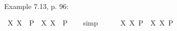\begin{isabellebody}
%
\isadelimproof
\ %
\endisadelimproof
%
\isatagproof
{}\isamarkupfalse%
\ \ \ %
%
\endisatagproof
{\isafoldproof}%
%
\isadelimproof
%
\endisadelimproof
\isanewline
{}\isamarkupfalse%
\ {\isachardoublequoteopen}{\isasymlfloor}{\isacharparenleft}{\isacharparenleft}{\isasymlambda}{\isasymalpha}{\isachardot}\ \isactrlbold {\isasymdiamond}{\isasymphi}\ {\isasymalpha}{\isacharparenright}\ \isactrlbold {\isasymdownharpoonleft}{\isacharparenleft}{\isasymtau}{\isacharcolon}{\isacharcolon}{\isasymup}{\isasymzero}{\isacharparenright}{\isacharparenright}\ \isactrlbold {\isasymleftrightarrow}\ {\isacharparenleft}\isactrlbold {\isasymdiamond}{\isasymphi}\ \isactrlbold {\isasymdownharpoonleft}{\isasymtau}{\isacharparenright}{\isasymrfloor}{\isachardoublequoteclose}\ \isamarkupfalse%
%
\isadelimproof
\ %
\endisadelimproof
%
\isatagproof
{}\isamarkupfalse%
\ \ \ %
%
\endisatagproof
{\isafoldproof}%
%
\isadelimproof
%
\endisadelimproof
%
\begin{isamarkuptext}%
Example 7.13, p. 96:%
\end{isamarkuptext}\isamarkuptrue%
\isamarkupfalse%
\ {\isachardoublequoteopen}{\isasymlfloor}{\isacharparenleft}{\isasymlambda}X{\isachardot}\ \isactrlbold {\isasymdiamond}\isactrlbold {\isasymexists}X{\isacharparenright}\ \ {\isacharparenleft}P{\isacharcolon}{\isacharcolon}{\isasymup}{\isasymlangle}{\isasymzero}{\isasymrangle}{\isacharparenright}\ \isactrlbold {\isasymrightarrow}\ \isactrlbold {\isasymdiamond}{\isacharparenleft}{\isacharparenleft}{\isasymlambda}X{\isachardot}\ \isactrlbold {\isasymexists}X{\isacharparenright}\ \ P{\isacharparenright}{\isasymrfloor}{\isachardoublequoteclose}%
\isadelimproof
\ \ %
\endisadelimproof
%
\isatagproof
{}\isamarkupfalse%
\ simp%
\endisatagproof
{\isafoldproof}%
%
\isadelimproof
%
\endisadelimproof
\ \ \ \ \isanewline
{}\isamarkupfalse%
\ {\isachardoublequoteopen}{\isasymlfloor}{\isacharparenleft}{\isasymlambda}X{\isachardot}\ \isactrlbold {\isasymdiamond}\isactrlbold {\isasymexists}X{\isacharparenright}\ \isactrlbold {\isasymdown}{\isacharparenleft}P{\isacharcolon}{\isacharcolon}{\isasymup}{\isasymlangle}{\isasymzero}{\isasymrangle}{\isacharparenright}\ \isactrlbold {\isasymrightarrow}\ \isactrlbold {\isasymdiamond}{\isacharparenleft}{\isacharparenleft}{\isasymlambda}X{\isachardot}\ \isactrlbold {\isasymexists}X{\isacharparenright}\ \isactrlbold {\isasymdown}P{\isacharparenright}{\isasymrfloor}{\isachardoublequoteclose}\isanewline

\end{isabellebody}
